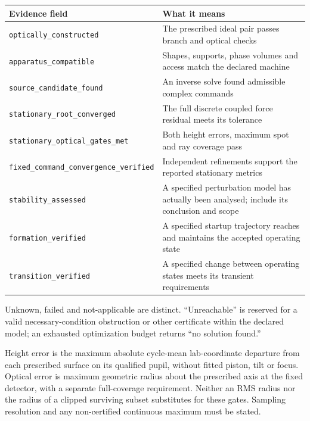 {\def\LTcaptype{none} %
\begin{longtable}[]{@{}
  >{\raggedright\arraybackslash}p{}
  >{\raggedright\arraybackslash}p{}@{}}
\toprule\noalign{}
\begin{minipage}[b]{\linewidth}\raggedright
Evidence field
\end{minipage} & \begin{minipage}[b]{\linewidth}\raggedright
What it means
\end{minipage} \\
\midrule\noalign{}
\endhead
\bottomrule\noalign{}
\endlastfoot
\texttt{optically\_constructed} & The prescribed ideal pair passes
branch and optical checks \\
\texttt{apparatus\_compatible} & Shapes, supports, phase volumes and
access match the declared machine \\
\texttt{source\_candidate\_found} & An inverse solve found admissible
complex commands \\
\texttt{stationary\_root\_converged} & The full discrete coupled force
residual meets its tolerance \\
\texttt{stationary\_optical\_gates\_met} & Both height errors, maximum
spot and ray coverage pass \\
\texttt{fixed\_command\_convergence\_verified} & Independent refinements
support the reported stationary metrics \\
\texttt{stability\_assessed} & A specified perturbation model has
actually been analysed; include its conclusion and scope \\
\texttt{formation\_verified} & A specified startup trajectory reaches
and maintains the accepted operating state \\
\texttt{transition\_verified} & A specified change between operating
states meets its transient requirements \\
\end{longtable}
}

Unknown, failed and not-applicable are distinct. ``Unreachable'' is
reserved for a valid necessary-condition obstruction or other
certificate within the declared model; an exhausted optimization budget
returns ``no solution found.''

Height error is the maximum absolute cycle-mean lab-coordinate departure
from each prescribed surface on its qualified pupil, without fitted
piston, tilt or focus. Optical error is maximum geometric radius about
the prescribed axis at the fixed detector, with a separate full-coverage
requirement. Neither an RMS radius nor the radius of a clipped surviving
subset substitutes for these gates. Sampling resolution and any
non-certified continuous maximum must be stated.

